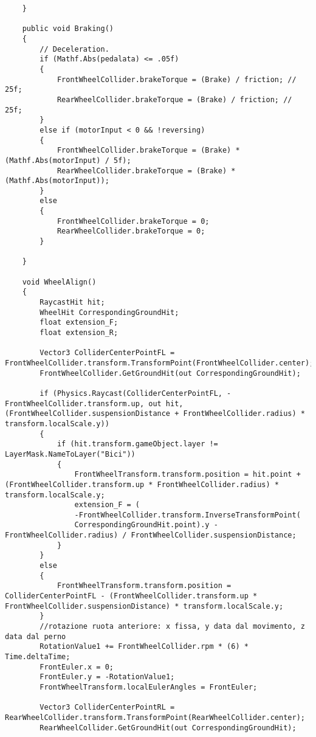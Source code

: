 \begin{lstlisting}
    }

    public void Braking()
    {
        // Deceleration.
        if (Mathf.Abs(pedalata) <= .05f)
        {
            FrontWheelCollider.brakeTorque = (Brake) / friction; // 25f;
            RearWheelCollider.brakeTorque = (Brake) / friction; // 25f;
        }
        else if (motorInput < 0 && !reversing)
        {
            FrontWheelCollider.brakeTorque = (Brake) * (Mathf.Abs(motorInput) / 5f);
            RearWheelCollider.brakeTorque = (Brake) * (Mathf.Abs(motorInput));
        }
        else
        {
            FrontWheelCollider.brakeTorque = 0;
            RearWheelCollider.brakeTorque = 0;
        }

    }

    void WheelAlign()
    {
        RaycastHit hit;
        WheelHit CorrespondingGroundHit;
        float extension_F;
        float extension_R;

        Vector3 ColliderCenterPointFL = FrontWheelCollider.transform.TransformPoint(FrontWheelCollider.center);
        FrontWheelCollider.GetGroundHit(out CorrespondingGroundHit);

        if (Physics.Raycast(ColliderCenterPointFL, -FrontWheelCollider.transform.up, out hit, (FrontWheelCollider.suspensionDistance + FrontWheelCollider.radius) * transform.localScale.y))
        {
            if (hit.transform.gameObject.layer != LayerMask.NameToLayer("Bici"))
            {
                FrontWheelTransform.transform.position = hit.point + (FrontWheelCollider.transform.up * FrontWheelCollider.radius) * transform.localScale.y;
                extension_F = (
                -FrontWheelCollider.transform.InverseTransformPoint(
                CorrespondingGroundHit.point).y - FrontWheelCollider.radius) / FrontWheelCollider.suspensionDistance;
			}
        }
        else
        {
            FrontWheelTransform.transform.position = ColliderCenterPointFL - (FrontWheelCollider.transform.up * FrontWheelCollider.suspensionDistance) * transform.localScale.y;
        }
        //rotazione ruota anteriore: x fissa, y data dal movimento, z data dal perno
        RotationValue1 += FrontWheelCollider.rpm * (6) * Time.deltaTime;
        FrontEuler.x = 0;
        FrontEuler.y = -RotationValue1;
        FrontWheelTransform.localEulerAngles = FrontEuler;

        Vector3 ColliderCenterPointRL = RearWheelCollider.transform.TransformPoint(RearWheelCollider.center);
        RearWheelCollider.GetGroundHit(out CorrespondingGroundHit);


\end{lstlisting}
